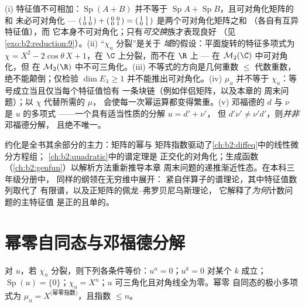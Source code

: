 \begin{remark}[常见误区]\label{rem:b2:reduction:pitfalls}
(i) 特征值不可相加：$\operatorname{Sp}(A + B)$ 并不等于
$\operatorname{Sp}A + \operatorname{Sp}B$，且可对角化矩阵的和
未必可对角化 ---
$\begin{psmallmatrix}1 & 1\\ 0 & 0\end{psmallmatrix} +
\begin{psmallmatrix}0 & 0\\ 0 & 1\end{psmallmatrix} =
\begin{psmallmatrix}1 & 1\\ 0 & 1\end{psmallmatrix}$ 是两个可对角化矩阵之和
（各自有互异特征值），而
它本身不可对角化；只有\emph{可交换}族才表现良好
（见\cref{exo:b2:reduction:9}）。(ii) “$\chi_u$ 分裂”是关于
\emph{域}的假设：平面旋转的特征多项式为 $\chi =
X^2 - 2\cos\theta\,X + 1$，在 $\C$ 上分裂，而不在 $\R$ 上 ---
在 $\mathcal{M}_2(\C)$ 中可对角化，但
在 $\mathcal{M}_2(\R)$ 中不可三角化。(iii) 不等式的方向是几何重数 $\leq$
代数重数，绝不能颠倒；仅检验 $\dim E_\lambda \geq
1$ 并不能推出可对角化。(iv) $\mu_u$ 并不等于
$\chi_u$：等号成立当且仅当每个特征值恰有
一条块链（例如伴侣矩阵，以及本章的
周末问题）；以 $\chi$ 代替所需的 $\mu$，
会使每一次幂运算都变得繁重。(v) 邓福德的 $d$ 与 $\nu$ 是
$u$ 的多项式 ——一个具有适当性质的分解 $u = d' + \nu'$，
但 $d'\nu' \neq \nu'd'$，则\emph{并非}邓福德分解，
且绝不唯一。
\end{remark}

\begin{remark}[本章的应用]
约化是全书其余部分的主力：矩阵的幂与
矩阵指数驱动了\cref{ch:b2:diffeq}中的线性微分方程组；
\cref{ch:b2:quadratic}中的谱定理是
正交化的对角化；生成函数
（\cref{ch:b2:genfun}）以解析方法重新推导本章
周末问题的递推渐近性态。在本科三年级分册中，
同样的纲领在无穷维中展开：
紧自伴算子的谱理论，其中特征值数列取代了
有限谱，以及正矩阵的佩龙–弗罗贝尼乌斯理论，
它解释了\emph{为何}计数问题的主特征值
是正的且单的。
\end{remark}

\section{幂零自同态与邓福德分解}

\begin{proposition}[幂零自同态]\label{prop:b2:reduction:nilpotent}
对 $u$，若 $\chi_u$ 分裂，则下列各条件等价：$u^n =
0$；$u^k = 0$ 对某个 $k$ 成立；$\operatorname{Sp}(u) = \{0\}$；$\chi_u
= X^n$；$u$ 可三角化且对角线全为零。幂零
自同态的极小多项式为 $\mu_u = X^{\text{(幂零指数)}}$，且指数
$\leq n$。
\end{proposition}

